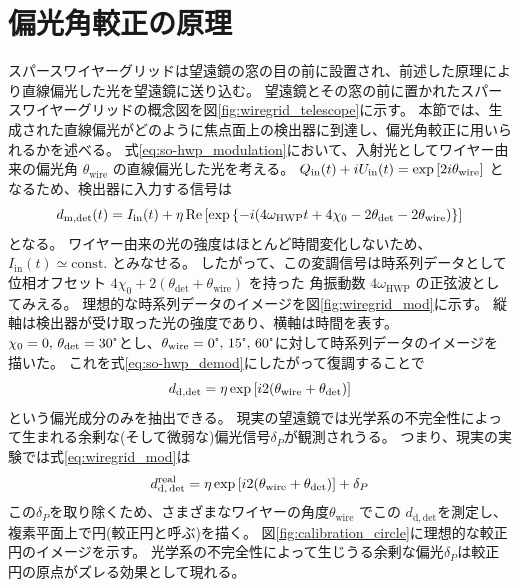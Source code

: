 \documentclass[../../main.tex]{subfiles}
\begin{document}
\section{偏光角較正の原理}
スパースワイヤーグリッドは望遠鏡の窓の目の前に設置され、前述した原理により直線偏光した光を望遠鏡に送り込む。
望遠鏡とその窓の前に置かれたスパースワイヤーグリッドの概念図を図\ref{fig:wiregrid_telescope}に示す。
本節では、生成された直線偏光がどのように焦点面上の検出器に到達し、偏光角較正に用いられるかを述べる。
式\eqref{eq:so-hwp_modulation}において、入射光としてワイヤー由来の偏光角 $\theta_{\mathrm{wire}}$ の直線偏光した光を考える。
$Q_{\mathrm{in}}(t) + iU_{\mathrm{in}}(t) = \exp\qty[2i\theta_{\mathrm{wire}}]$ となるため、検出器に入力する信号は
\begin{equation}
    d_{\mathrm{m}, \mathrm{det}}(t) = I_{\mathrm{in}}(t) + \eta\Re\qty[\exp\qty{-i \qty(4\omega_{\mathrm{HWP}}t + 4\chi_0 - 2\theta_{\mathrm{det}} - 2\theta_{\mathrm{wire}})}]
\end{equation}
となる。
ワイヤー由来の光の強度はほとんど時間変化しないため、$I_{\mathrm{in}}(t) \simeq \mathrm{const.}$ とみなせる。
したがって、この変調信号は時系列データとして位相オフセット $4\chi_0 + 2(\theta_{\mathrm{det}} + \theta_{\mathrm{wire}})$ を持った
角振動数 $4\omega_{\mathrm{HWP}}$ の正弦波としてみえる。
理想的な時系列データのイメージを図\ref{fig:wiregrid_mod}に示す。
縦軸は検出器が受け取った光の強度であり、横軸は時間を表す。
$\chi_0=0,\,\theta_{\mathrm{det}}=30\tcdegree$とし、$\theta_\mathrm{wire}=0\tcdegree,\,15\tcdegree,\,60\tcdegree$に対して時系列データのイメージを描いた。
これを式\eqref{eq:so-hwp_demod}にしたがって復調することで
\begin{equation}
    d_{\mathrm{d, det}} = \eta\exp\qty[i2\qty(\theta_{\mathrm{wire}} + \theta_{\mathrm{det}})]
    \label{eq:wiregrid_mod}
\end{equation}
という偏光成分のみを抽出できる。
現実の望遠鏡では光学系の不完全性によって生まれる余剰な(そして微弱な)偏光信号$\delta_{P}$が観測されうる。
つまり、現実の実験では式\eqref{eq:wiregrid_mod}は
\begin{equation}
    d_{\mathrm{d,\,det}}^{\mathrm{real}} = \eta\exp\qty[i2\qty(\theta_{\mathrm{wire}} + \theta_{\mathrm{det}})] + \delta_{P}
\end{equation}
この$\delta_{P}$を取り除くため、さまざまなワイヤーの角度$\theta_{\mathrm{wire}}$ でこの $d_{\mathrm{d, det}}$を測定し、複素平面上で円(較正円と呼ぶ)を描く。
図\ref{fig:calibration_circle}に理想的な較正円のイメージを示す。
光学系の不完全性によって生じうる余剰な偏光$\delta_{P}$は較正円の原点がズレる効果として現れる。
\end{document}
